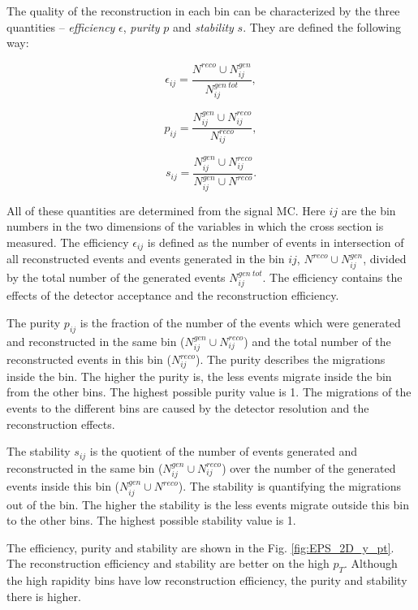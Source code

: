 The quality of the reconstruction in each bin can be characterized by the three quantities -- \textit{efficiency} $\epsilon$, \textit{purity} $p$ and
\textit{stability} $s$. They are defined the following way:

\begin{equation}
 \epsilon_{ij} = \frac{N^{reco} \cup N_{ij}^{gen}}{N_{ij}^{gen\:tot}},
\end{equation}

\begin{equation}
 p_{ij} = \frac{N_{ij}^{gen} \cup N_{ij}^{reco}}{N_{ij}^{reco}},
\end{equation}

\begin{equation}
 s_{ij} = \frac{N_{ij}^{gen} \cup N_{ij}^{reco}}{N_{ij}^{gen} \cup N^{reco}}.
\end{equation}

All of these quantities are determined from the signal MC. Here $ij$ are the bin numbers in the two dimensions of the variables in which
the cross section is measured. The efficiency 
$\epsilon_{ij}$ is defined as the number of events in intersection of all reconstructed events and events generated in the bin $ij$, 
$N^{reco} \cup N_{ij}^{gen}$, divided by the total number of the generated events $N_{ij}^{gen\:tot}$. 
The efficiency contains the effects of the detector acceptance and the reconstruction efficiency.

The purity $p_{ij}$ is the fraction of the number of the events which were generated and reconstructed in the same bin ($N_{ij}^{gen} \cup N_{ij}^{reco}$)
and the total number of the reconstructed events in this bin ($N_{ij}^{reco}$). The purity describes the migrations inside the bin.
The higher the purity is, the less events migrate inside the bin from the other bins. The highest possible purity value is 1.
The migrations of the events to the different bins are caused by the detector resolution and the reconstruction effects.

The stability $s_{ij}$ is the quotient of the number of events generated and reconstructed in the same bin ($N_{ij}^{gen} \cup N_{ij}^{reco}$) over the 
number of the generated events inside this bin ($N_{ij}^{gen} \cup N^{reco}$). The stability is quantifying the migrations out of the bin. The higher 
the stability is the less events migrate outside this bin to the other bins. The highest possible stability value is 1.

The efficiency, purity and stability are shown in the Fig. \ref{fig:EPS_2D_y_pt}. The reconstruction efficiency and stability are better on the
high $p_{T}$. Although the high rapidity bins have low reconstruction efficiency, the purity and stability there is higher.

